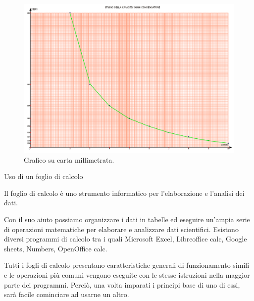 \documentclass[12pt,a4paper,oneside]{book}
\makeatletter
\renewcommand{\section}{\@startsection{section}{1}{\z@}
{-4ex \@plus -1ex \@minus -.4ex}
{1ex \@plus.2ex }
{\normalfont\large\sffamily\bfseries}}
\theoremstyle{esercizio}
\makeatother
\begin{document}
    \begin{figure}[h!]
    \centering
    \includegraphics[width=\linewidth]{path_to_image/graficomanuale.pdf} 
    \caption{Grafico su carta millimetrata.}
    \label{fig:graficomanuale}
\end{figure} 


 










\section{Uso di un foglio di calcolo}

\begin{definizione}
    Il foglio di calcolo è uno strumento informatico per l'elaborazione e l'analisi  dei dati.
\end{definizione}

Con il suo aiuto possiamo organizzare  i dati in tabelle ed eseguire un'ampia serie di operazioni matematiche per elaborare e analizzare dati scientifici. Esistono diversi programmi di calcolo tra i quali Microsoft Excel, Libreoffice calc, Google sheets, Numbers, OpenOffice calc. 

\begin{remark}
Tutti i fogli di calcolo presentano caratteristiche generali di funzionamento simili e le operazioni più comuni vengono eseguite con le stesse istruzioni nella maggior parte dei programmi. Perciò, una volta imparati i principi base di uno di essi, sarà facile cominciare ad usarne un altro. 
    \end{remark}
\end{document}
